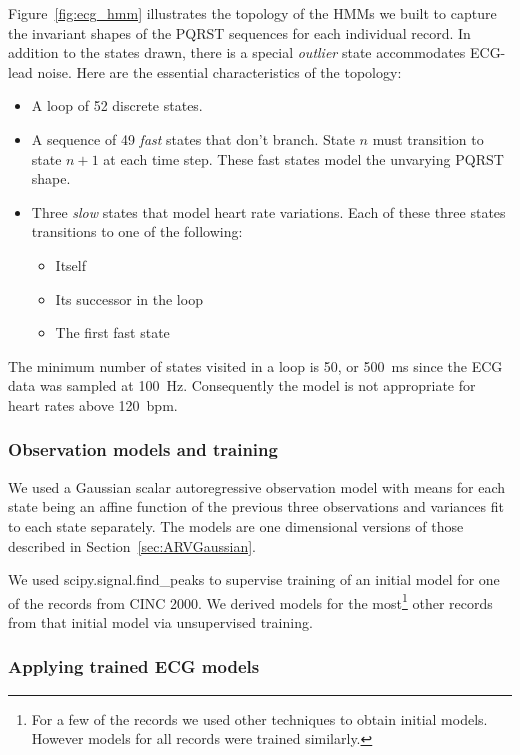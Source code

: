 Figure~\ref{fig:ecg_hmm} illustrates the topology of the HMMs we built
to capture the invariant shapes of the PQRST sequences for each
individual record.  In addition to the states drawn, there is a
special \emph{outlier} state accommodates ECG-lead noise.  Here are
the essential characteristics of the topology:
\begin{itemize}
\item A loop of 52 discrete states.
\item A sequence of 49 \emph{fast} states that don't branch.  State $n$ must
  transition to state $n+1$ at each time step.  These fast states
  model the unvarying PQRST shape.
\item Three \emph{slow} states that model heart rate variations.
  Each of these three states transitions to one of the following:
  \begin{itemize}
  \item Itself
  \item Its successor in the loop
  \item The first fast state
  \end{itemize}
\end{itemize}
The minimum number of states visited in a loop is 50, or 500~ms since
the ECG data was sampled at 100~Hz.  Consequently the model is not
appropriate for heart rates above 120~bpm.

\subsubsection{Observation models and training}
\label{sec:ecg_training}

We used a Gaussian scalar autoregressive observation model with means
for each state being an affine function of the previous three
observations and variances fit to each state separately.  The models
are one dimensional versions of those described in
Section~\ref{sec:ARVGaussian}.

We used scipy.signal.find\_peaks to supervise training of an initial
model for one of the records from CINC 2000.  We derived models for
the most\footnote{For a few of the records we used other techniques to
  obtain initial models.  However models for all records were trained
  similarly.} other records from that initial model via unsupervised
training.

\subsubsection{Applying trained ECG models}
\label{sec:applying_ECG_models}

